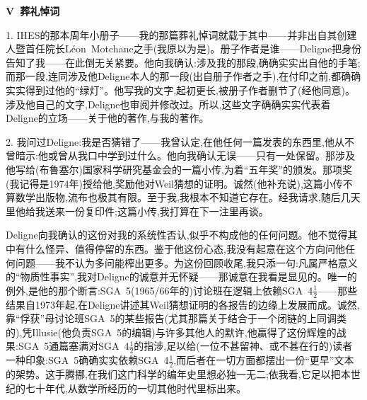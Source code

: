 \textbf{V~葬礼悼词}

1. IHES的那本周年小册子——我的那篇葬礼悼词就载于其中——并非出自其创建人暨首任院长Léon~Motchane之手(我原以为是)。册子作者是谁——Deligne把身份告知了我——在此倒无关紧要。他向我确认:涉及我的那段,确确实实出自他的手笔;而那一段,连同涉及他Deligne本人的那一段(出自册子作者之手),在付印之前,都确确实实得到过他的“绿灯”。他写我的文字,起初更长,被册子作者删节了(经他同意)。涉及他自己的文字,Deligne也审阅并修改过。所以,这些文字确确实实代表着Deligne的立场——关于他的著作,与我的著作。

2. 我问过Deligne:我是否猜错了——我曾认定,在他任何一篇发表的东西里,他从不曾暗示:他或曾从我口中\dmark{}学到过什么。他向我确认无误——只有一处保留。那涉及他写给(布鲁塞尔)国家科学研究基金会的一篇小传,为着“五年奖”的颁发。那项奖(我记得是1974年)授给他,奖励他对Weil猜想的证明。诚然(他补充说),这篇小传不算数学出版物,流布也极其有限。至于我,我根本不知道它存在。经我请求,随后几天里他给我送来一份复印件;这篇小传,我打算在下一注里再谈。

Deligne向我确认的这份对我的系统性否认,似乎不构成他的任何问题。他不觉得其中有什么怪异、值得停留的东西。鉴于他这份心态,我没有起意在这个方向问他任何问题——我不认为多问能榨出更多。为这份回顾收尾,我只添一句:凡属严格意义的“物质性事实”,我对Deligne的诚意并无怀疑——那诚意在我看是显见的。唯一的例外,是他的那个断言:SGA~5(1965/66年的)讨论班在逻辑上依赖SGA~4$\frac{1}{2}$——那些结果自1973年起,在Deligne讲述其Weil猜想证明的各报告的边缘上发展而成。诚然,靠“俘获”母讨论班SGA~5的某些报告(尤其那篇关于结合于一个闭链的上同调类的),凭Illusie(他负责SGA~5的编辑)与许多其他人的默许,他赢得了这份辉煌的战果:SGA~5通篇塞满对SGA~4$\frac{1}{2}$的指涉,足以给(一位不甚留神、或不甚在行的)读者一种印象:SGA~5确确实实依赖SGA~4$\frac{1}{2}$,而后者在一切方面都摆出一份“更早”文本的架势。这手腾挪,在我们这门科学的编年史里想必独一无二;依我看,它足以把本世纪的七十年代,从数学所经历的一切其他时代里标出来。

